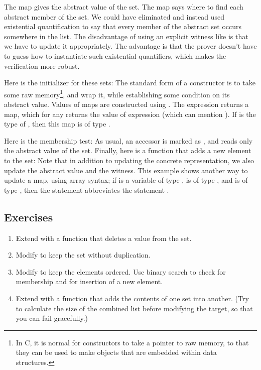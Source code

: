 \noindent 
The map  gives the abstract value of the set. The map
 says where to find each abstract member of the set. We could
have eliminated  and instead used existential quantification
to say that every member of the abstract set occurs somewhere in the
list. The disadvantage of using an explicit witness like  is
that we have to update it appropriately. The advantage is that the
prover doesn't have to guess how to instantiate such existential
quantifiers, which makes the verification more robust.

Here is the initializer for these sets:
\noindent
The standard form of a constructor is to take some raw
memory\footnote{
In C, it is normal for constructors to take a pointer to raw memory,
to that they can be used to make objects that are embedded within data
structures. 
}, and
wrap it, while establishing some condition on its abstract value.
Values of maps are constructed using .  The
expression  returns a map, which for any 
returns the value of expression  (which can mention ).
If  is the type of , then this map is of type
.

Here is the membership test:
\noindent
As usual, an accessor is marked as , and reads only the
abstract value of the set. Finally, here is a function that adds a new
element to the set:
\noindent
Note that in addition to updating the concrete representation, we also
update the abstract value and the witness. This example shows another
way to update a map, using array syntax; if  is a variable of
type ,  is of type , and  is of
type ,  then the statement  abbreviates the
statement 
.

\subsection*{Exercises}
\begin{enumerate}
\item Extend  with a function that deletes a value from
  the set. 
\item Modify  to keep the set without duplication.
\item Modify  to keep the elements ordered. Use binary
  search to check for membership and for insertion of a new element.
\item Extend  with a function that adds the contents of
  one set into another. (Try to calculate the size of the combined list
  before modifying the target, so that you can fail gracefully.)
\end{enumerate}

